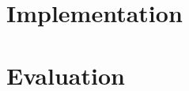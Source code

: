 \documentclass[sigconf, screen, review]{acmart}
\begin{document}
\section{Implementation}
\label{sec:implementation}





\section{Evaluation}
\label{sec:evaluation}

\end{document}
